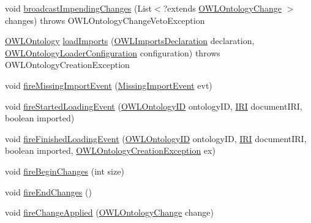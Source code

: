 \begin{DoxyCompactItemize}
\item 
void \hyperlink{classuk_1_1ac_1_1manchester_1_1cs_1_1owl_1_1owlapi_1_1_o_w_l_ontology_manager_impl_a4c98cc66310ee1074a6ce17af97a9dbc}{broadcast\-Impending\-Changes} (List$<$?extends \hyperlink{classorg_1_1semanticweb_1_1owlapi_1_1model_1_1_o_w_l_ontology_change}{O\-W\-L\-Ontology\-Change} $>$ changes)  throws O\-W\-L\-Ontology\-Change\-Veto\-Exception 
\item 
\hyperlink{interfaceorg_1_1semanticweb_1_1owlapi_1_1model_1_1_o_w_l_ontology}{O\-W\-L\-Ontology} \hyperlink{classuk_1_1ac_1_1manchester_1_1cs_1_1owl_1_1owlapi_1_1_o_w_l_ontology_manager_impl_ab6f6e61d7321ce3904716b4964423d6d}{load\-Imports} (\hyperlink{interfaceorg_1_1semanticweb_1_1owlapi_1_1model_1_1_o_w_l_imports_declaration}{O\-W\-L\-Imports\-Declaration} declaration, \hyperlink{classorg_1_1semanticweb_1_1owlapi_1_1model_1_1_o_w_l_ontology_loader_configuration}{O\-W\-L\-Ontology\-Loader\-Configuration} configuration)  throws O\-W\-L\-Ontology\-Creation\-Exception 
\item 
void \hyperlink{classuk_1_1ac_1_1manchester_1_1cs_1_1owl_1_1owlapi_1_1_o_w_l_ontology_manager_impl_a5b44f32ee1da9fd4adc1cfa88f09b45a}{fire\-Missing\-Import\-Event} (\hyperlink{classorg_1_1semanticweb_1_1owlapi_1_1model_1_1_missing_import_event}{Missing\-Import\-Event} evt)
\item 
void \hyperlink{classuk_1_1ac_1_1manchester_1_1cs_1_1owl_1_1owlapi_1_1_o_w_l_ontology_manager_impl_a315f82a56f4a4d64d62e85f114368415}{fire\-Started\-Loading\-Event} (\hyperlink{classorg_1_1semanticweb_1_1owlapi_1_1model_1_1_o_w_l_ontology_i_d}{O\-W\-L\-Ontology\-I\-D} ontology\-I\-D, \hyperlink{classorg_1_1semanticweb_1_1owlapi_1_1model_1_1_i_r_i}{I\-R\-I} document\-I\-R\-I, boolean imported)
\item 
void \hyperlink{classuk_1_1ac_1_1manchester_1_1cs_1_1owl_1_1owlapi_1_1_o_w_l_ontology_manager_impl_a50e5742498d8e5b0793de698d3672361}{fire\-Finished\-Loading\-Event} (\hyperlink{classorg_1_1semanticweb_1_1owlapi_1_1model_1_1_o_w_l_ontology_i_d}{O\-W\-L\-Ontology\-I\-D} ontology\-I\-D, \hyperlink{classorg_1_1semanticweb_1_1owlapi_1_1model_1_1_i_r_i}{I\-R\-I} document\-I\-R\-I, boolean imported, \hyperlink{classorg_1_1semanticweb_1_1owlapi_1_1model_1_1_o_w_l_ontology_creation_exception}{O\-W\-L\-Ontology\-Creation\-Exception} ex)
\item 
void \hyperlink{classuk_1_1ac_1_1manchester_1_1cs_1_1owl_1_1owlapi_1_1_o_w_l_ontology_manager_impl_a302c024844af4cac8cab2b245bd0ca0b}{fire\-Begin\-Changes} (int size)
\item 
void \hyperlink{classuk_1_1ac_1_1manchester_1_1cs_1_1owl_1_1owlapi_1_1_o_w_l_ontology_manager_impl_a07442589809e57f8ff197492120532f1}{fire\-End\-Changes} ()
\item 
void \hyperlink{classuk_1_1ac_1_1manchester_1_1cs_1_1owl_1_1owlapi_1_1_o_w_l_ontology_manager_impl_a93d8cb9b0477d6cfc615b0b3f03daa36}{fire\-Change\-Applied} (\hyperlink{classorg_1_1semanticweb_1_1owlapi_1_1model_1_1_o_w_l_ontology_change}{O\-W\-L\-Ontology\-Change} change)
\end{DoxyCompactItemize}
